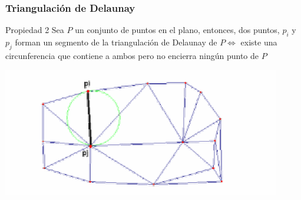 \begin{frame}
  \frametitle{Triangulación de Delaunay}
  \begin{beamerboxesrounded}[shadow=true]{Propiedad 2}
    Sea $P$ un conjunto de puntos en el plano, entonces, dos puntos, $p_i$ y
    $p_j$ forman un segmento de la triangulación de Delaunay de $P
    \Leftrightarrow$ existe una circunferencia que contiene a ambos pero no
    encierra ningún punto de $P$
  \end{beamerboxesrounded}
  \begin{center}
  \includegraphics[height=0.20\textwidth]{images/propiedad2}
  \end{center}
\end{frame}
